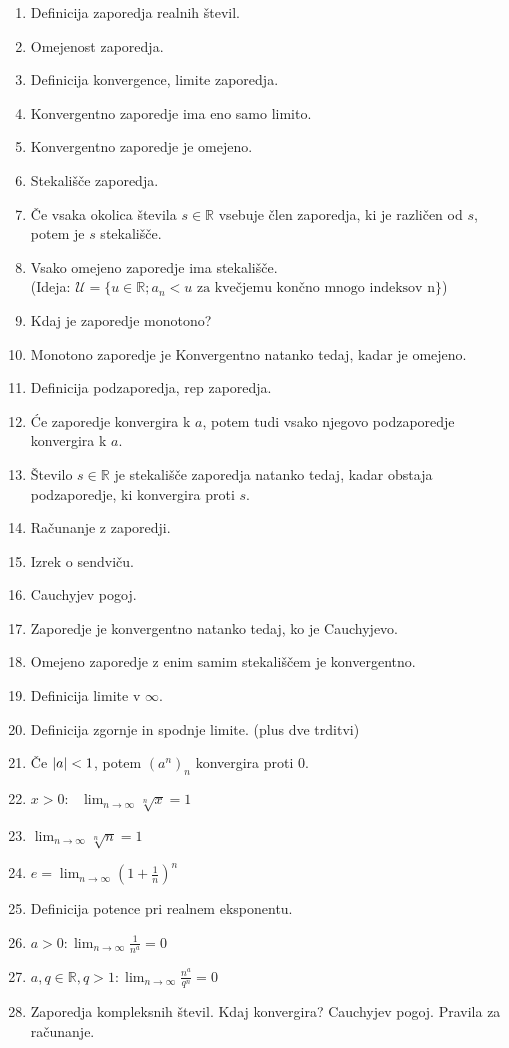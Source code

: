\documentclass[a4paper,12pt]{report}
\begin{document}
\begin{enumerate}
    \item Definicija zaporedja realnih števil.
    \item Omejenost zaporedja.
    \item Definicija konvergence, limite zaporedja.
    \item Konvergentno zaporedje ima eno samo limito.
    \item Konvergentno zaporedje je omejeno.
    \item Stekališče zaporedja.
    \item Če vsaka okolica števila $s \in \mathbb{R}$ vsebuje člen zaporedja, ki je različen od $s$, potem je $s$ stekališče.
    \item Vsako omejeno zaporedje ima stekališče. \\ (Ideja: $\mathcal{U} = \{ u \in \mathbb{R}; a_n < u \text{ za kvečjemu končno mnogo indeksov n} \}$)
    \item Kdaj je zaporedje monotono?
    \item Monotono zaporedje je Konvergentno natanko tedaj, kadar je omejeno.
    \item Definicija podzaporedja, rep zaporedja.
    \item Će zaporedje konvergira k $a$, potem tudi vsako njegovo podzaporedje konvergira k $a$.
    \item Število $s \in \mathbb{R}$ je stekališče zaporedja natanko tedaj, kadar obstaja podzaporedje, ki konvergira proti $s$.
    \item Računanje z zaporedji.
    \item Izrek o sendviču.
    \item Cauchyjev pogoj.
    \item Zaporedje je konvergentno natanko tedaj, ko je Cauchyjevo.
    \item Omejeno zaporedje z enim samim stekališčem je konvergentno.
    \item Definicija limite v $\infty$.
    \item Definicija zgornje in spodnje limite. (plus dve trditvi)
    \item Če $\abs{a} < 1$, potem $(a^n)_n$ konvergira proti 0.
    \item $x > 0: \text{ } \lim_{n \to \infty} \sqrt[n]{x} = 1$
    \item $\lim_{n \to \infty} \sqrt[n]{n} = 1$
    \item $e = \lim_{n \to \infty}(1 + \frac{1}{n})^n$
    \item Definicija potence pri realnem eksponentu.
    \item $a > 0: \lim_{n \to \infty} \frac{1}{n^a} = 0$
    \item $a,q \in \mathbb{R}, q > 1: \lim_{n \to \infty} \frac{n^a}{q^n} = 0$
    \item Zaporedja kompleksnih števil. Kdaj konvergira? Cauchyjev pogoj. Pravila za računanje.
\end{enumerate}
\end{document}
